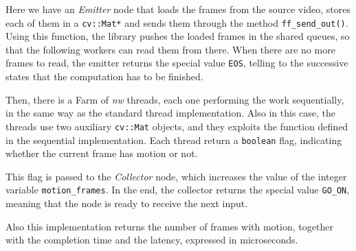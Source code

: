 Here we have an \emph{Emitter} node that loads the frames from the source video, stores each of them in a \texttt{cv::Mat*} and sends them through the method \texttt{ff\_send\_out()}. Using this function, the library pushes the loaded frames in the shared queues, so that the following workers can read them from there. When there are no more frames to read, the emitter returns the special value \texttt{EOS}, telling to the successive states that the computation has to be finished.

Then, there is a Farm of \emph{nw} threads, each one performing the work sequentially, in the same way as the standard thread implementation. Also in this case, the threads use two auxiliary \texttt{cv::Mat} objects, and they exploits the function defined in the sequential implementation.
Each thread return a \texttt{boolean} flag, indicating whether the current frame has motion or not.

This flag is passed to the \emph{Collector} node, which increases the value of the integer variable \texttt{motion\_frames}. In the end, the collector returns the special value \texttt{GO\_ON}, meaning that the node is ready to receive the next input.

Also this implementation returns the number of frames with motion, together with the completion time and the latency, expressed in microseconds.